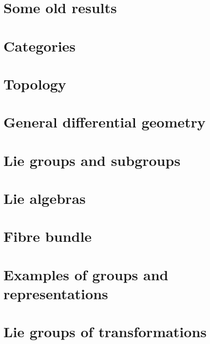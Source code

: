 

\chapter{Some old results}


\chapter{Categories}        \label{chap_category}


\chapter{Topology}              \label{chap_topology}



\chapter{General differential geometry} \label{Chapitre_FB}


\chapter{Lie groups and subgroups}


\chapter{Lie algebras}
  
 





\chapter{Fibre bundle}



\chapter{Examples of groups and representations}        \label{ChapThoComsGroupes}



\chapter{Lie groups of transformations}


